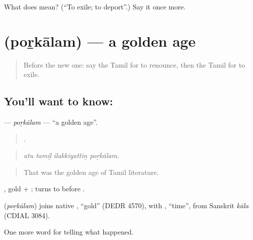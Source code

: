 \begin{tcolorbox}[breakable,colback=teal!4,colframe=teal!35!black,title={Before you move on}]
What does  mean? (\textquotedblleft{}To exile; to deport\textquotedblright{}.) Say it once more.
\end{tcolorbox}
\section[\texorpdfstring{\ta{பொற்காலம்} (poṟkālam)}{பொற்காலம் (poṟkālam)}]{ (poṟkālam) — a golden age}

\label{lesson:TA-C340-porkalam}



\begin{quote}
Before the new one: say the Tamil for to renounce, then the Tamil for to exile.
\end{quote}

\subsection*{You'll want to know: }
\textbf{} — \emph{poṟkālam} — \textquotedblleft{}a golden age\textquotedblright{}.

\begin{quote}
   .
\end{quote}

\begin{quote}
\emph{atu tamiḻ ilakkiyattiṉ poṟkālam.}
\end{quote}

\begin{quote}
That was the golden age of Tamil literature.
\end{quote}

, gold + ;  turns to  before .

\begin{cousinweb}
\textbf{} (\emph{poṟkālam}) joins native , \textquotedblleft{}gold\textquotedblright{} (DEDR 4570), with , \textquotedblleft{}time\textquotedblright{}, from Sanskrit \emph{kāla} (CDIAL 3084).
\end{cousinweb}

\begin{grammarlens}[title={What you've built}]
One more word for telling what happened.
\end{grammarlens}

